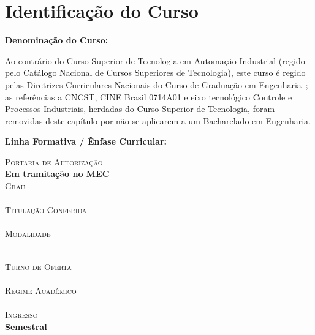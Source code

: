 \chapter{Identificação do Curso}
\label{chp:identificacao}


\begin{center}
\parbox{0.8\textwidth}{\textbf{Denominação do Curso:} \ppccurso}

Ao contrário do Curso Superior de Tecnologia em Automação Industrial (regido pelo Catálogo Nacional de Cursos Superiores de Tecnologia), este curso é regido pelas Diretrizes Curriculares Nacionais do Curso de Graduação em Engenharia~\cite{cne_ces_2_2019,cne_ces_1_2021}; as referências a CNCST, CINE Brasil 0714A01 e eixo tecnológico Controle e Processos Industriais, herdadas do Curso Superior de Tecnologia, foram removidas deste capítulo por não se aplicarem a um Bacharelado em Engenharia.

\parbox{0.8\textwidth}{\textbf{Linha Formativa / Ênfase Curricular:} \ppcenfasecurricular}

\parbox{0.8\textwidth}{
    \textsc{\small \textcolor{AzulClaro}{Portaria de Autorização}} \\ \hspace*{15mm} \textbf{Em tramitação no MEC}\\
    \textsc{\small \textcolor{AzulClaro}{Grau}} \\ \hspace*{15mm} \textbf{\ppcgrau}\\
    \textsc{\small \textcolor{AzulClaro}{Titulação Conferida}} \\ \hspace*{15mm} \textbf{\ppctitulacao}\\
    \textsc{\small \textcolor{AzulClaro}{Modalidade}} \\ \hspace*{15mm} \textbf{\ppcmodalidade\footnotemark}\\
}

\parbox{0.8\textwidth}{
    \textsc{\small \textcolor{AzulClaro}{Turno de Oferta}} \\ \hspace*{15mm} \textbf{\ppcturno}\\
    \textsc{\small \textcolor{AzulClaro}{Regime Acadêmico}} \\ \hspace*{15mm} \textbf{\ppcregimeacademico}\\
    \textsc{\small \textcolor{AzulClaro}{Ingresso}} \\ \hspace*{15mm} \textbf{Semestral}
}


\end{center}
